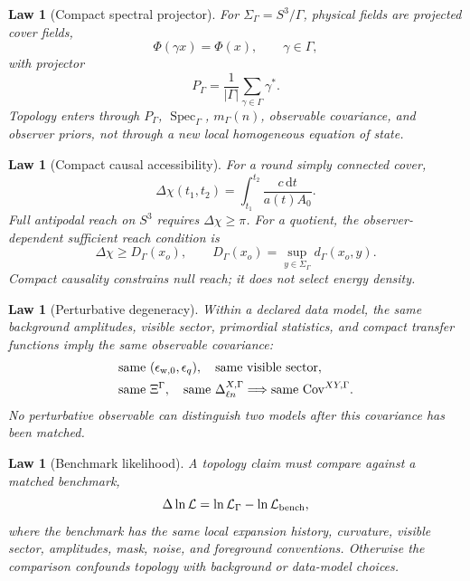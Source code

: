 \documentclass[
  aps,
  prd,
  reprint,
  superscriptaddress,
  floatfix,
  nofootinbib,
  longbibliography
]{revtex4-2}
\theoremstyle{plain}
\newtheorem{law}[theorem]{Law}
\theoremstyle{definition}
\theoremstyle{remark}
\newcommand{\dd}{\mathrm d}
\newcommand{\wind}{\mathrm w}
\DeclareMathOperator{\Spec}{Spec}
\newcommand{\eps}{\epsilon}
\newcommand{\PG}{P_\Gamma}
\begin{document}
\begin{law}[Compact spectral projector]
For \(\Sigma_\Gamma=S^3/\Gamma\), physical fields are projected cover fields,
\begin{equation}
\Phi(\gamma x)=\Phi(x),
\qquad
\gamma\in\Gamma,
\end{equation}
with projector
\begin{equation}
\PG=\frac1{|\Gamma|}\sum_{\gamma\in\Gamma}\gamma^*.
\label{eq:standard_projector_law}
\end{equation}
Topology enters through \(\PG\), \(\Spec_\Gamma\), \(m_\Gamma(n)\), observable
covariance, and observer priors, not through a new local homogeneous equation
of state.
\end{law}

\begin{law}[Compact causal accessibility]
For a round simply connected cover,
\begin{equation}
\Delta\chi(t_1,t_2)=\int_{t_1}^{t_2}\frac{c\,\dd t}{a(t)A_0}.
\end{equation}
Full antipodal reach on \(S^3\) requires \(\Delta\chi\ge\pi\).  For a quotient,
the observer-dependent sufficient reach condition is
\begin{equation}
\Delta\chi\ge D_\Gamma(x_o),
\qquad
D_\Gamma(x_o)=\sup_{y\in\Sigma_\Gamma}d_\Gamma(x_o,y).
\label{eq:standard_causal_quotient_law}
\end{equation}
Compact causality constrains null reach; it does not select energy density.
\end{law}

\begin{law}[Perturbative degeneracy]
Within a declared data model, the same background amplitudes, visible sector,
primordial statistics, and compact transfer functions imply the same observable
covariance:
\begin{equation}
\begin{aligned}
&\text{same }(\eps_{\wind,0},\eps_q),\quad
\text{same visible sector},
\\
&\text{same }\Xi^\Gamma,\quad
\text{same }\Delta_{\ell n}^{X,\Gamma}
\Longrightarrow
\text{same }{\rm Cov}^{XY,\Gamma} .
\end{aligned}
\label{eq:standard_perturbative_degeneracy}
\end{equation}
No perturbative observable can distinguish two models after this covariance has
been matched.
\end{law}

\begin{law}[Benchmark likelihood]
A topology claim must compare against a matched benchmark,
\begin{equation}
\Delta\ln\mathcal L
=
\ln\mathcal L_\Gamma-
\ln\mathcal L_{\rm bench},
\label{eq:standard_benchmark_likelihood}
\end{equation}
where the benchmark has the same local expansion history, curvature, visible
sector, amplitudes, mask, noise, and foreground conventions.  Otherwise the
comparison confounds topology with background or data-model choices.
\end{law}
\end{document}

